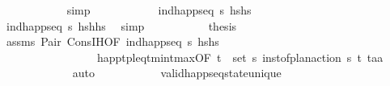 \begin{isabellebody}
\ \ \ \ \ \ \ \ \ \ \isamarkupfalse%
\ simp\isanewline
\ \ \ \ \ \ \ \ \isamarkupfalse%
\ \isamarkupfalse%
\ {\isachardoublequoteopen}ind{\isacharunderscore}{\kern0pt}happ{\isacharunderscore}{\kern0pt}seq\ {\isasympi}s\ {\isacharparenleft}{\kern0pt}hs{\isacharprime}{\kern0pt}{\isacharprime}{\kern0pt}{\isacharat}{\kern0pt}hs{\isacharparenright}{\kern0pt}{\isachardoublequoteclose}\isanewline
\ \ \ \ \ \ \ \ \ \ \isamarkupfalse%
\ {\isacartoucheopen}ind{\isacharunderscore}{\kern0pt}happ{\isacharunderscore}{\kern0pt}seq\ {\isasympi}s\ {\isacharparenleft}{\kern0pt}hs{\isacharprime}{\kern0pt}{\isacharat}{\kern0pt}h{\isacharhash}{\kern0pt}hs{\isacharparenright}{\kern0pt}{\isacartoucheclose}\ \isamarkupfalse%
\ simp\isanewline
\ \ \ \ \ \ \ \ \ \isamarkupfalse%
\ {\isacharquery}{\kern0pt}thesis\isanewline
\ \ \ \ \ \ \ \ \ \ \ \isamarkupfalse%
\ assms\ Pair\ Cons{\isachardot}{\kern0pt}IH{\isacharbrackleft}{\kern0pt}OF\ {\isacartoucheopen}ind{\isacharunderscore}{\kern0pt}happ{\isacharunderscore}{\kern0pt}seq\ {\isasympi}s\ {\isacharparenleft}{\kern0pt}hs{\isacharprime}{\kern0pt}{\isacharprime}{\kern0pt}{\isacharat}{\kern0pt}hs{\isacharparenright}{\kern0pt}{\isacartoucheclose}{\isacharbrackright}{\kern0pt}\isanewline
\ \ \ \ \ \ \ \ \ \ \ \ \ \ \ \ \ happ{\isacharunderscore}{\kern0pt}tp{\isacharunderscore}{\kern0pt}leq{\isacharunderscore}{\kern0pt}t\isactrlsub m\isactrlsub i\isactrlsub n{\isacharunderscore}{\kern0pt}t\isactrlsub m\isactrlsub a\isactrlsub x{\isacharbrackleft}{\kern0pt}OF\ {\isacartoucheopen}{\isacharparenleft}{\kern0pt}t\isactrlsub {\isasympi}{\isacharcomma}{\kern0pt}{\isasympi}{\isacharparenright}{\kern0pt}\ {\isasymin}\ set\ {\isasympi}s{\isacartoucheclose}\ {\isacartoucheopen}inst{\isacharunderscore}{\kern0pt}of{\isacharunderscore}{\kern0pt}plan{\isacharunderscore}{\kern0pt}action\ {\isasympi}s\ {\isacharparenleft}{\kern0pt}t\isactrlsub {\isasympi}{\isacharcomma}{\kern0pt}{\isasympi}{\isacharparenright}{\kern0pt}\ {\isacharparenleft}{\kern0pt}t\isactrlsub a{\isacharcomma}{\kern0pt}a{\isacharparenright}{\kern0pt}{\isacartoucheclose}{\isacharbrackright}{\kern0pt}\isanewline
\ \ \ \ \ \ \ \ \ \ \ \isamarkupfalse%
\ auto\isanewline
\ \ \ \ \isamarkupfalse%
\isanewline
\ \ \isamarkupfalse%
%
\endisatagproof
{\isafoldproof}%
%
\isadelimproof
\isanewline
%
\endisadelimproof
\isanewline
\ \ \isamarkupfalse%
\ valid{\isacharunderscore}{\kern0pt}happ{\isacharunderscore}{\kern0pt}seq{\isacharunderscore}{\kern0pt}state{\isacharunderscore}{\kern0pt}unique{\isacharcolon}{\kern0pt}\isanewline

\end{isabellebody}
